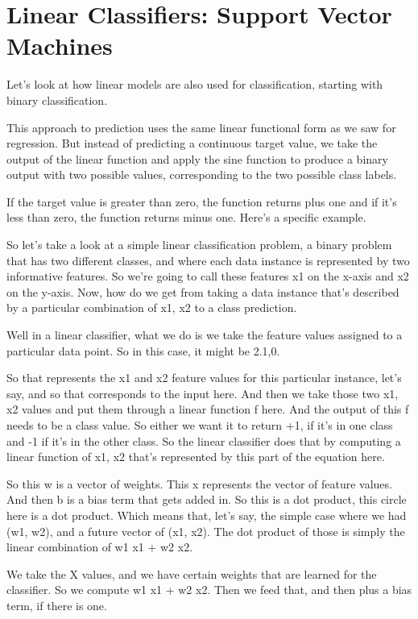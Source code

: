 \section{Linear Classifiers: Support Vector Machines}
\begin{multicols}{2}

Let's look at how linear models are also used for classification, starting with binary classification. 

This approach to prediction uses the same linear functional form as we saw for regression. But instead of predicting a continuous target value, we take the output of the linear function and apply the sine function to produce a binary output with two possible values, corresponding to the two possible class labels. 

If the target value is greater than zero, the function returns plus one and if it's less than zero, the function returns minus one. Here's a specific example. 

So let's take a look at a simple linear classification problem, a binary problem that has two different classes, and where each data instance is represented by two informative features. So we're going to call these features x1 on the x-axis and x2 on the y-axis. Now, how do we get from taking a data instance that's described by a particular combination of x1, x2 to a class prediction. 

Well in a linear classifier, what we do is we take the feature values assigned to a particular data point. So in this case, it might be 2.1,0. 

So that represents the x1 and x2 feature values for this particular instance, let's say, and so that corresponds to the input here. And then we take those two x1, x2 values and put them through a linear function f here. And the output of this f needs to be a class value. So either we want it to return +1, if it's in one class and -1 if it's in the other class. So the linear classifier does that by computing a linear function of x1, x2 that's represented by this part of the equation here. 

So this w is a vector of weights. This x represents the vector of feature values. And then b is a bias term that gets added in. So this is a dot product, this circle here is a dot product. Which means that, let's say, the simple case where we had (w1, w2), and a future vector of (x1, x2). The dot product of those is simply the linear combination of w1 x1 + w2 x2. 

We take the X values, and we have certain weights that are learned for the classifier. So we compute w1 x1 + w2 x2. Then we feed that, and then plus a bias term, if there is one. 


\end{multicols}
